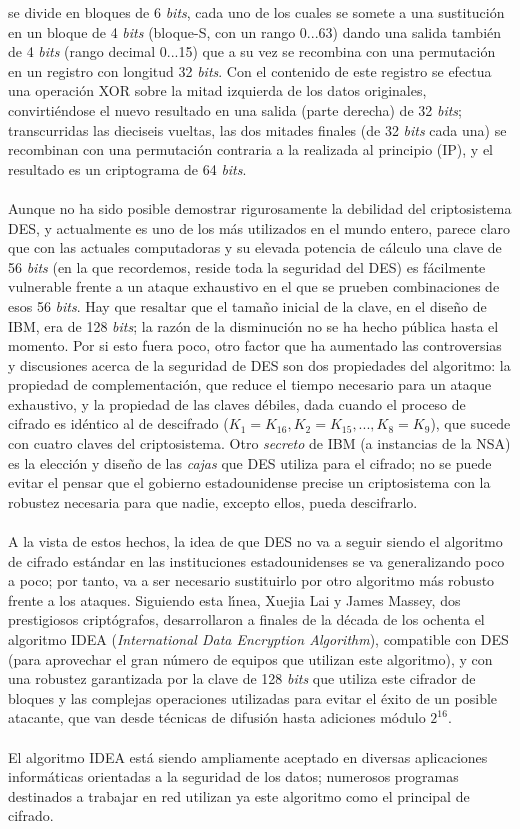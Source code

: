 se divide en bloques de 6 {\it bits}, cada uno de los cuales se somete a una
sustituci\'on en un bloque de 4 {\it bits} (bloque-S, con un rango 0...63)
dando una salida tambi\'en de 4 {\it bits} (rango decimal 0...15) que a
su vez se recombina con una permutaci\'on en un registro con longitud
32 {\it bits}. Con el contenido de este registro se efectua una operaci\'on
XOR sobre la mitad izquierda de los datos originales, convirti\'endose
el nuevo resultado en una salida (parte derecha) de 32 {\it bits}; transcurridas
las dieciseis vueltas, las dos mitades finales (de 32 {\it bits} cada una) se 
recombinan con una permutaci\'on contraria a la realizada al principio (IP),
y el resultado es un criptograma de 64 {\it bits}.\\
\\Aunque no ha sido posible demostrar rigurosamente la debilidad del
criptosistema DES, y actualmente es uno de los m\'as utilizados en el mundo
entero, parece claro que con las actuales computadoras y su elevada potencia
de c\'alculo una clave de 56 {\it bits} (en la que recordemos, reside toda
la seguridad del DES) es f\'acilmente vulnerable frente a un ataque
exhaustivo en el que se prueben combinaciones de esos 56 {\it bits}. Hay que
resaltar que el tama\~no inicial de la clave, en el dise\~no
de IBM, era de 128 {\it bits}; la raz\'on de la disminuci\'on no se
ha hecho p\'ublica hasta el momento. Por si esto fuera poco, otro
factor que ha aumentado las controversias y discusiones acerca de la seguridad
de DES son dos propiedades del algoritmo: la propiedad de complementaci\'on,
que reduce el tiempo necesario para un ataque exhaustivo, y la propiedad
de las claves d\'ebiles, dada cuando el proceso de cifrado es id\'entico
al de descifrado 
($K_{1}=K_{16}, K_{2}=K_{15},..., K_{8}=K_{9}$), que sucede con cuatro claves
del criptosistema. Otro {\it secreto} de IBM (a instancias de la NSA)
es la elecci\'on y dise\~no de las {\it cajas} que
DES utiliza para el cifrado; no se puede evitar el pensar que el gobierno
estadounidense precise un criptosistema con la robustez necesaria para
que nadie, excepto ellos, pueda descifrarlo.\\
\\A la vista de estos hechos, la idea de que DES no va a seguir siendo
el algoritmo de cifrado est\'andar en las instituciones estadounidenses
se va generalizando poco a poco; por tanto, va a ser necesario sustituirlo
por otro algoritmo m\'as robusto frente a los ataques.
Siguiendo esta l\'{\i}nea, Xuejia Lai y James Massey, dos prestigiosos
cript\'ografos, desarrollaron a finales de la d\'ecada de los
ochenta el algoritmo IDEA ({\it International Data Encryption Algorithm}), 
compatible con DES (para aprovechar el gran n\'umero de equipos que utilizan
este algoritmo), y con una robustez garantizada por la clave de 128 {\it bits}
que utiliza este cifrador de bloques y las complejas operaciones
utilizadas para evitar el \'exito de un posible atacante, que van
desde t\'ecnicas de difusi\'on hasta adiciones m\'odulo
$2^{16}$.\\
\\El algoritmo IDEA est\'a siendo ampliamente aceptado en diversas
aplicaciones inform\'aticas orientadas a la seguridad de los datos;
numerosos programas destinados a trabajar en red utilizan ya este algoritmo como
el principal de cifrado.
